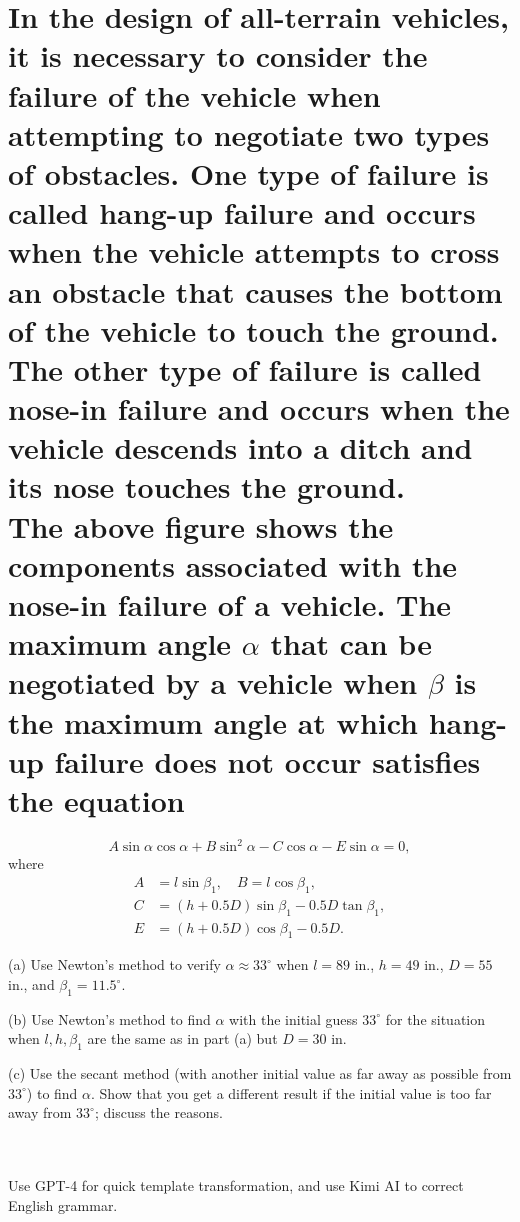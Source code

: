 \documentclass[a4paper]{article}
\begin{document}
\section*{In the design of all-terrain vehicles, it is necessary to consider the failure of the vehicle when attempting to negotiate two types of obstacles. One type of failure is called hang-up failure and occurs when the vehicle attempts to cross an obstacle that causes the bottom of the vehicle to touch the ground. The other type of failure is called nose-in failure and occurs when the vehicle descends into a ditch and its nose touches the ground.\\
The above figure shows the components associated with the nose-in failure of a vehicle. The maximum angle $\alpha$ that can be negotiated by a vehicle when $\beta$ is the maximum angle at which hang-up failure does not occur satisfies the equation}
\[
A\sin\alpha\cos\alpha + B\sin^2\alpha - C\cos\alpha - E\sin\alpha = 0,
\]
where
\[
\begin{aligned}
A &= l\sin\beta_1, \quad B = l\cos\beta_1, \\
C &= (h + 0.5 D)\sin\beta_1 - 0.5 D\tan\beta_1, \\
E &= (h + 0.5 D)\cos\beta_1 - 0.5 D.
\end{aligned}
\]

(a) Use Newton's method to verify $\alpha \approx 33^{\circ}$ when $l = 89$ in., $h = 49$ in., $D = 55$ in., and $\beta_1 = 11.5^{\circ}$.

(b) Use Newton's method to find $\alpha$ with the initial guess $33^{\circ}$ for the situation when $l, h, \beta_1$ are the same as in part (a) but $D = 30$ in.

(c) Use the secant method (with another initial value as far away as possible from $33^{\circ}$) to find $\alpha$. Show that you get a different result if the initial value is too far away from $33^{\circ}$; discuss the reasons.

\begin{verbatim}

\end{verbatim}

\section*{  }
Use GPT-4 for quick template transformation, and use Kimi AI to correct English grammar.
\end{document}
